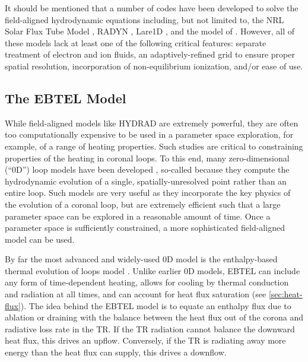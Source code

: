 It should be mentioned that a number of codes have been developed to solve the field-aligned hydrodynamic equations including, but not limited to, the NRL Solar Flux Tube Model \citep{mariska_numerical_1989,warren_evolving_2003}, RADYN \citep{allred_unified_2015}, Lare1D \citep{johnston_new_2017}, and the model of \citet{mikic_importance_2013}. However, all of these models lack at least one of the following critical features: separate treatment of electron and ion fluids, an adaptively-refined grid to ensure proper spatial resolution, incorporation of non-equilibrium ionization, and/or ease of use. 

\subsection{The EBTEL Model}\label{sec:ebtel}

While field-aligned models like HYDRAD are extremely powerful, they are often too computationally expensive to be used in a parameter space exploration, for example, of a range of heating properties. Such studies are critical to constraining properties of the heating in coronal loops. To this end, many zero-dimensional (``0D'') loop models have been developed \citep[e.g.][]{kuin_thermal_1982,fisher_equation_1990,kopp_coronal_1993,cargill_implications_1994,aschwanden_hydrodynamic_2009}, so-called because they compute the hydrodynamic evolution of a single, spatially-unresolved point rather than an entire loop. Such models are very useful as they incorporate the key physics of the evolution of a coronal loop, but are extremely efficient such that a large parameter space can be explored in a reasonable amount of time. Once a parameter space is sufficiently constrained, a more sophisticated field-aligned model can be used.

By far the most advanced and widely-used 0D model is the enthalpy-based thermal evolution of loops model \citep[EBTEL,][]{klimchuk_highly_2008}. Unlike earlier 0D models, EBTEL can include any form of time-dependent heating, allows for cooling by thermal conduction and radiation at all times, and can account for heat flux saturation (see \autoref{sec:heat-flux}). The idea behind the EBTEL model is to equate an enthalpy flux due to ablation or draining with the balance between the heat flux out of the corona and radiative loss rate in the TR. If the TR radiation cannot balance the downward heat flux, this drives an upflow. Conversely, if the TR is radiating away more energy than the heat flux can supply, this drives a downflow.

